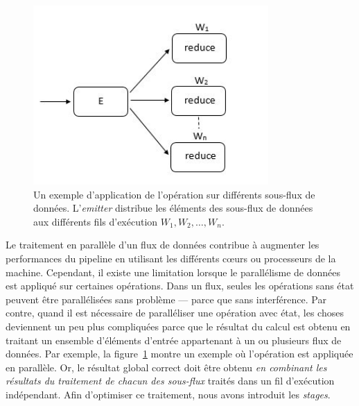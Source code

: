 
\begin{figure}
\centering
     \includegraphics[width=0.8\textwidth]{Figures/StageDataParallel.jpg}
      \caption[Un exemple d'application de l'op\'eration  sur diff\'erents sous-flux de donn\'ees.]{Un exemple d'application de l'op\'eration  sur diff\'erents sous-flux de donn\'ees. L'\emph{emitter}  distribue  les \'el\'ements des sous-flux de donn\'ees aux diff\'erents fils d'ex\'ecution $W_1, W_2, \ldots, W_n$.}
       \label{StageDataParallel.fig}
\end{figure}




Le traitement en parall\`ele d'un flux de donn\'ees contribue \`a augmenter les performances du pipeline en utilisant les diff\'erents cœurs ou processeurs de la machine. Cependant, il existe une limitation lorsque le parall\'elisme de donn\'ees est appliqu\'e sur certaines op\'erations. Dans un flux, seules les op\'erations sans \'etat peuvent \^etre parall\'elis\'ees sans probl\`eme --- parce que sans interf\'erence. Par contre, quand il est n\'ecessaire de parall\'eliser une op\'eration avec \'etat, les choses deviennent un peu plus compliqu\'ees parce que le r\'esultat du calcul est obtenu en traitant un ensemble d'\'el\'ements d'entr\'ee appartenant \`a un ou plusieurs flux de donn\'ees. Par exemple, la figure~\ref{StageDataParallel.fig} montre un exemple o\`u l'op\'eration  est appliqu\'ee en parall\`ele. Or, le r\'esultat global correct doit \^etre obtenu \emph{en combinant les r\'esultats du traitement de chacun des sous-flux} trait\'es dans un fil d'ex\'ecution ind\'ependant. Afin d'optimiser ce traitement, nous avons introduit les \emph{stages}.

